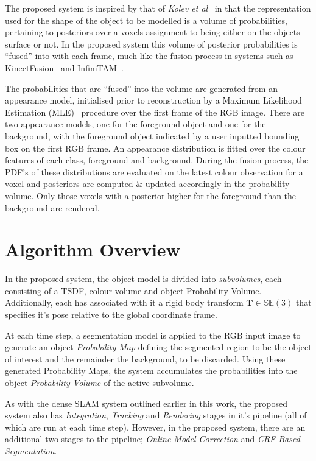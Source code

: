 The proposed system is inspired by that of \textit{Kolev et al}~\cite{Kolev2006} 
in that the representation used for the shape of the object to be modelled is a 
volume of probabilities, pertaining to posteriors over a voxels assignment to 
being either on the objects surface or not. In the proposed system this volume 
of posterior probabilities is ``fused'' into with each frame, much like the 
fusion process in systems such as KinectFusion~\cite{Newcombe2011} and 
InfiniTAM~\cite{Prisacariu2014}.

The probabilities that are ``fused'' into the volume are generated from an
appearance model, initialised prior to reconstruction by a Maximum Likelihood 
Estimation (MLE)~\cite{BishopPRML} procedure over the first frame of the RGB image. 
There are two appearance models, one for the foreground object and one for the 
background, with the foreground object indicated by a user inputted bounding box 
on the first RGB frame. An appearance distribution is fitted over the colour features 
of each class, foreground and background. During the fusion process, the PDF's of 
these distributions are evaluated on the latest colour observation for a voxel and 
posteriors are computed \& updated accordingly in the probability volume. Only 
those voxels with a posterior higher for the foreground than the background 
are rendered.

\section{Algorithm Overview}
In the proposed system, the object model is divided into \textit{subvolumes}, 
each consisting of a TSDF, colour volume and object Probability Volume. 
Additionally, each has associated with it a rigid body transform 
\(\bm{T} \in \mathbb{SE}(3)\) that specifies it's pose relative to the global 
coordinate frame.

At each time step, a segmentation model is applied to the RGB input image to
generate an object \textit{Probability Map} defining the segmented region to be
the object of interest and the remainder the background, to be discarded. Using
these generated Probability Maps, the system accumulates the probabilities into
the object \textit{Probability Volume} of the active subvolume.

As with the dense SLAM system outlined earlier in this work, the proposed system
also has \textit{Integration}, \textit{Tracking} and \textit{Rendering}
stages in it's pipeline (all of which are run at each time step). However, in
the proposed system, there are an additional two stages to the pipeline;
\textit{Online Model Correction} and \textit{CRF Based Segmentation}.

